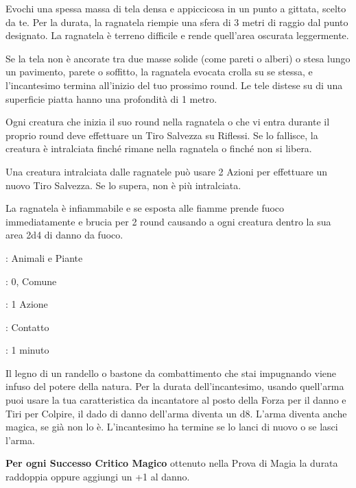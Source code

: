 \begin{multicols}{2}
Evochi una spessa massa di tela densa e appiccicosa in un punto a gittata, scelto da te. Per la durata, la ragnatela riempie una sfera di 3 metri di raggio dal punto designato. La ragnatela è terreno difficile e rende quell'area oscurata leggermente.

Se la tela non è ancorate tra due masse solide (come pareti o alberi) o stesa lungo un pavimento, parete o soffitto, la ragnatela evocata crolla su se stessa, e l'incantesimo termina all'inizio del tuo prossimo round. Le tele distese su di una superficie piatta hanno una profondità di 1 metro.

Ogni creatura che inizia il suo round nella ragnatela o che vi entra durante il proprio round deve effettuare un Tiro Salvezza su Riflessi. Se lo fallisce, la creatura è intralciata finché rimane nella ragnatela o finché non si libera.

Una creatura intralciata dalle ragnatele può usare 2 Azioni per effettuare un nuovo Tiro Salvezza. Se lo supera, non è più intralciata.

La ragnatela è infiammabile e se esposta alle fiamme prende fuoco immediatamente e brucia per 2 round causando a ogni creatura dentro la sua area 2d4 di danno da fuoco.

\noindent\colorbox{OBSSgold!10}{
\begin{minipage}{0.95\linewidth}
\begin{description}[noitemsep, topsep=0pt, parsep=0pt, partopsep=0pt, leftmargin=0cm, labelwidth=1.3cm]
	\item[\textbf{Lista}]: Animali e Piante
	\item[\textbf{Livello}]: 0, Comune
	\item[\textbf{Lancio}]: 1 Azione
	\item[\textbf{Gittata}]: Contatto
	\item[\textbf{Durata}]: 1 minuto
\end{description}
\end{minipage}}\smallskip

Il legno di un randello o bastone da combattimento che stai impugnando viene infuso del potere della natura. Per la durata dell'incantesimo, usando quell'arma puoi usare la tua caratteristica da incantatore al posto della Forza per il danno e Tiri per Colpire, il dado di danno dell'arma diventa un d8. L'arma diventa anche magica, se già non lo è. L'incantesimo ha termine se lo lanci di nuovo o se lasci l'arma.

\textbf{Per ogni Successo Critico Magico} ottenuto nella Prova di Magia la durata raddoppia oppure aggiungi un +1 al danno.


\end{multicols}
